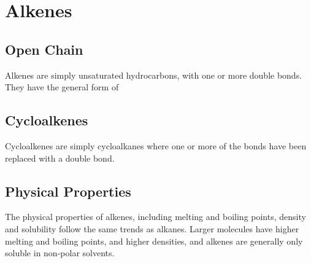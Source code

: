 



\pagebreak
\section{Alkenes}

\subsection{Open Chain}

	Alkenes are simply unsaturated hydrocarbons, with one or more double bonds. They have the general form of



\subsection{Cycloalkenes}

	Cycloalkenes are simply cycloalkanes where one or more of the  bonds have been replaced with a  double
	bond.





\subsection{Physical Properties}

	The physical properties of alkenes, including melting and boiling points, density and solubility follow the
	same trends as alkanes. Larger molecules have higher melting and boiling points, and higher densities, and alkenes are
	generally only soluble in non-polar solvents.


